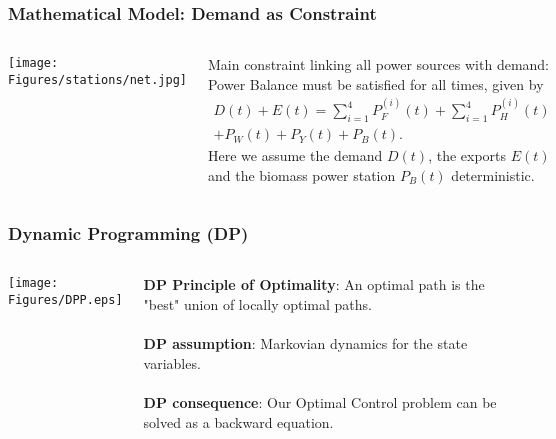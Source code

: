 
\begin{frame}
\frametitle{Mathematical Model: Demand as Constraint}

\begin{columns}[c]

\texttt{[image: Figures/stations/net.jpg]}

\alert{Main constraint linking all power sources with demand:} Power Balance must be satisfied for all times, given by
\begin{multline*}
D(t)+E(t)=\sum_{i=1}^4P_F^{(i)}(t)+\sum_{i=1}^4P_H^{(i)}(t)\\
+P_W(t)+P_Y(t)+P_B(t).
\end{multline*}
Here we assume the demand $D(t)$, the exports $E(t)$ and the biomass power station $P_B(t)$ deterministic.

\end{columns}
\end{frame}


\begin{frame}
\frametitle{Dynamic Programming (DP)}

\begin{columns}[c] %

\texttt{[image: Figures/DPP.eps]}

\textbf{\alert{DP Principle of Optimality}}: An optimal path is the "best" union of locally optimal paths.\\
\quad\\
\textbf{\alert{DP assumption}}: Markovian dynamics for the state variables.\\
\quad\\
\textbf{\alert{DP consequence}}: Our Optimal Control problem can be solved as a backward equation.

\end{columns}

\end{frame}

